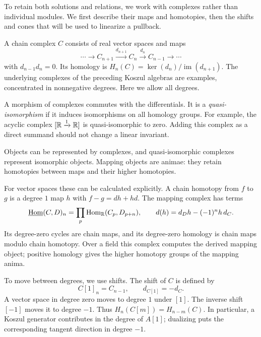 To retain both solutions and relations, we work with complexes rather
than individual modules. We first describe their maps and homotopies,
then the shifts and cones that will be used to linearize a pullback.

A chain complex $C$ consists of real vector spaces and maps
\[
 \cdots\longrightarrow C_{n+1}\xrightarrow{d_{n+1}}C_n
 \xrightarrow{d_n}C_{n-1}\longrightarrow\cdots
\]
with $d_{n-1}d_n=0$. Its homology is
$H_n(C)=\ker(d_n)/\operatorname{im}(d_{n+1})$.
The underlying complexes of the preceding Koszul algebras are examples,
concentrated in nonnegative degrees. Here we allow all degrees.

A morphism of complexes commutes with the differentials. It is a
\emph{quasi-isomorphism} if it induces isomorphisms on all homology groups.
For example, the acyclic complex $[\mathbb{R}\xrightarrow{1}\mathbb{R}]$ is
quasi-isomorphic to zero. Adding this complex as a direct summand should
not change a linear invariant.


Objects can be represented by complexes, and quasi-isomorphic complexes
represent isomorphic objects. Mapping objects are animae: they retain
homotopies between maps and their higher homotopies.

For vector spaces these can be calculated explicitly. A chain homotopy
from $f$ to $g$ is a degree $1$ map $h$ with $f-g=dh+hd$.
The mapping complex has terms
\[
 \underline{\operatorname{Hom}}(C,D)_n
 =\prod_p\operatorname{Hom}_{\mathbb{R}}(C_p,D_{p+n}),\qquad
 d(h)=d_Dh-(-1)^n h\,d_C.
\]
Its degree-zero cycles are chain maps, and its degree-zero homology
is chain maps modulo chain homotopy. Over a field this complex computes
the derived mapping object; positive homology gives the higher
homotopy groups of the mapping anima.

To move between degrees, we use shifts. The shift of $C$ is defined by
\[
 C[1]_n=C_{n-1},\qquad d_{C[1]}=-d_C.
\]
A vector space in degree zero moves to degree $1$ under $[1]$.
The inverse shift $[-1]$ moves it to degree $-1$.
Thus $H_n(C[m])=H_{n-m}(C)$.
In particular, a Koszul generator contributes in the degree of $A[1]$;
dualizing puts the corresponding tangent direction in degree $-1$.

